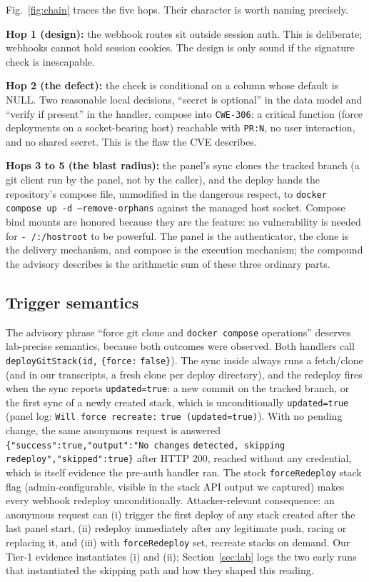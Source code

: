 \documentclass[journal]{IEEEtran}
\begin{document}
Fig.~\ref{fig:chain} traces the five hops. Their character is worth naming
precisely.

\textbf{Hop 1 (design):} the webhook routes sit outside session auth. This is
deliberate; webhooks cannot hold session cookies. The design is only sound if
the signature check is inescapable.

\textbf{Hop 2 (the defect):} the check is conditional on a column whose
default is NULL. Two reasonable local decisions, ``secret is optional'' in the
data model and ``verify if present'' in the handler, compose into
\texttt{CWE-306}: a critical function (force deployments on a socket-bearing
host) reachable with \texttt{PR:N}, no user interaction, and no
shared secret. This is the flaw the CVE describes.

\textbf{Hops 3 to 5 (the blast radius):} the panel's sync clones the tracked
branch (a git client run by the panel, not by the caller), and the deploy
hands the repository's compose file, unmodified in the dangerous respect, to
\texttt{docker compose up -d --remove-orphans} against the managed host
socket. Compose bind mounts are honored because they are the feature: no
vulnerability is needed for \texttt{- /:/hostroot} to be powerful. The panel
is the authenticator, the clone is the delivery mechanism, and compose is the
execution mechanism; the compound the advisory describes is the arithmetic sum
of these three ordinary parts.

\subsection{Trigger semantics}
\label{sec:semantics}

The advisory phrase ``force git clone and \texttt{docker compose}
operations'' deserves lab-precise semantics, because both outcomes were
observed. Both handlers call \texttt{deployGitStack(id,} \texttt{\{force:}
\texttt{false\}}). The sync inside always runs a fetch/clone (and in our
transcripts, a fresh clone per deploy directory), and the redeploy fires when
the sync reports \texttt{updated=true}: a new commit on the tracked branch, or
the first sync of a newly created stack, which is unconditionally
\texttt{updated=true} (panel log: \texttt{Will force recreate:}
\texttt{true (updated=true)}). With no pending change, the same anonymous
request is answered \texttt{\{"success":true,}\texttt{"output":"No changes}
\texttt{detected, skipping redeploy","skipped":true\}} after HTTP 200, reached
without any credential, which is itself evidence the pre-auth handler ran. The
stock \texttt{forceRedeploy} stack flag (admin-configurable, visible in the
stack API output we captured) makes every webhook redeploy unconditionally.
Attacker-relevant consequence: an anonymous request can (i) trigger the first
deploy of any stack created after the last panel start, (ii) redeploy
immediately after any legitimate push, racing or replacing it, and (iii) with
\texttt{forceRedeploy} set, recreate stacks on demand. Our Tier-1 evidence
instantiates (i) and (ii); Section~\ref{sec:lab} logs the two early runs that
instantiated the skipping path and how they shaped this reading.
\end{document}
